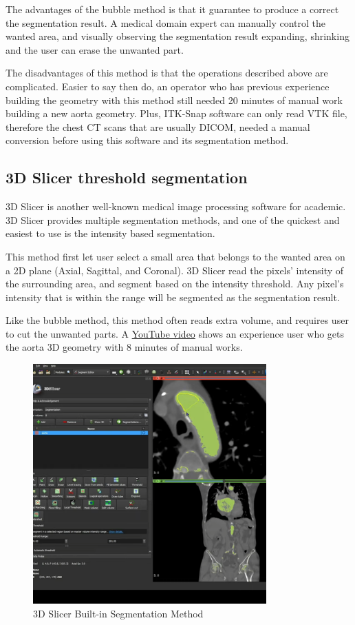 The advantages of the bubble method is that it guarantee to produce a correct the segmentation result. A medical domain expert can manually control the wanted area, and visually observing the segmentation result expanding, shrinking and the user can erase the unwanted part.

The disadvantages of this method is that the operations described above are complicated. Easier to say then do, an operator who has previous experience building the geometry with this method still needed 20 minutes of manual work building a new aorta geometry. Plus, ITK-Snap software can only read VTK file, therefore the chest CT scans that are usually DICOM, needed a manual conversion before using this software and its segmentation method.

\subsection{3D Slicer threshold segmentation}
3D Slicer is another well-known medical image processing software for academic. 3D Slicer provides multiple segmentation methods, and one of the quickest and easiest to use is the intensity based segmentation.

This method first let user select a small area that belongs to the wanted area on a 2D plane (Axial, Sagittal, and Coronal). 3D Slicer read the pixels' intensity of the surrounding area, and segment based on the intensity threshold. Any pixel's intensity that is within the range will be segmented as the segmentation result. 

Like the bubble method, this method often reads extra volume, and requires user to cut the unwanted parts. A \href{https://www.youtube.com/watch?v=5_673cHMBiY}{YouTube video} shows an experience user who gets the aorta 3D geometry with 8 minutes of manual works. 

\begin{figure}[H]
    \centering
    \includegraphics[width=0.8\textwidth]{figures/Sample/3D-Slicer-Segmentation.png}
    \caption[3D Slicer Built-in Segmentation UI]{3D Slicer Built-in Segmentation Method}
    \label{fig_3D_Seg_Builtin}
\end{figure}

